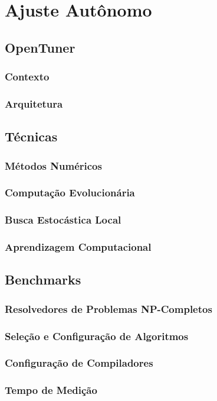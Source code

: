 \chapter{Ajuste Autônomo}
\label{chap:autotuning}

\section{OpenTuner}
\label{sec:opentuner}

\subsection{Contexto}
\label{subsec:context}

\subsection{Arquitetura}
\label{subsec:arch}

\section{Técnicas}
\label{sec:techniques}

\subsection{Métodos Numéricos}
\label{subsec:num}

\subsection{Computação Evolucionária}
\label{subsec:tuninevolcomp}

\subsection{Busca Estocástica Local}
\label{subsec:tuningsls}

\subsection{Aprendizagem Computacional}
\label{subsec:tuningml}

\section{Benchmarks}
\label{sec:benchmarks}

\subsection{Resolvedores de Problemas NP-Completos}
\label{subsec:np}

\subsection{Seleção e Configuração de Algoritmos}
\label{subsec:algsel}

\subsection{Configuração de Compiladores}
\label{subsec:compilerconfig}

\subsection{Tempo de Medição}
\label{subsec:measure}

